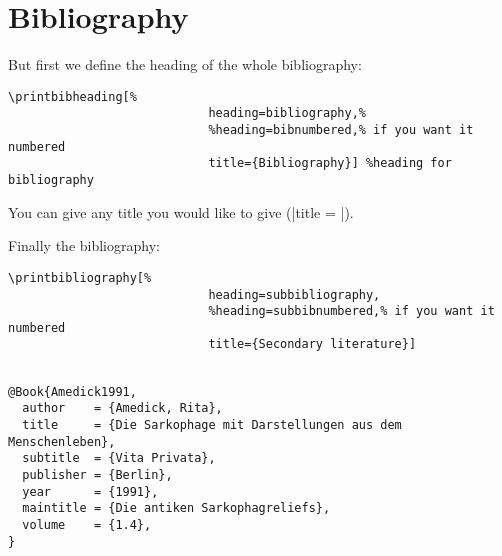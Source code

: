 \documentclass[a4paper,
10pt,
english
]{ltxdoc}
\begin{document}
 \section{Bibliography}\label{bibliographie}
 \DescribeMacro{\printbibliography}
But first we define the heading of the whole  bibliography:
\begin{lstlisting}
\printbibheading[%
							heading=bibliography,%
							%heading=bibnumbered,% if you want it numbered
							title={Bibliography}] %heading for bibliography
\end{lstlisting}
You can give any title you would like to give (|title = |).

Finally the bibliography:
\begin{lstlisting}
\printbibliography[%
							heading=subbibliography,
							%heading=subbibnumbered,% if you want it numbered
							title={Secondary literature}]
\end{lstlisting}

\nocite{*}
\begin{bsp}
\renewcommand\bibfont{\normalfont\footnotesize}
\printbibheading[%
							heading=bibliography,%
							title={Bibliography}] %
\printbibliography[%
							notkeyword=ancient,%
							notkeyword=corpus,%
							heading=subbibliography,
							title={Secondary literature}]
\end{bsp}

\begin{lstlisting}

@Book{Amedick1991,
  author    = {Amedick, Rita},
  title     = {Die Sarkophage mit Darstellungen aus dem Menschenleben},
  subtitle  = {Vita Privata},
  publisher = {Berlin},
  year      = {1991},
  maintitle = {Die antiken Sarkophagreliefs},
  volume    = {1.4},
}


\end{lstlisting}
\end{document}
